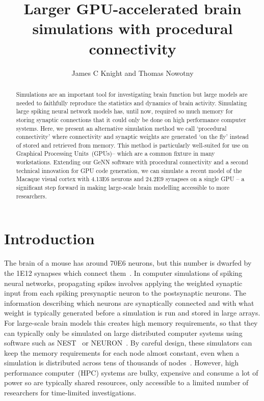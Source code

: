 \documentclass[9pt,a4paper]{amsart}
\title{Larger GPU-accelerated brain simulations with procedural connectivity}
\author{James C Knight and Thomas Nowotny}
\newcommand{\todo}[1]{\textbf{\textsc{\textcolor{red}{(TODO: #1)}}}}
\begin{document}
\begin{abstract}
Simulations are an important tool for investigating brain function but large models are needed to faithfully reproduce the statistics and dynamics of brain activity.
Simulating large spiking neural network models has, until now, required so much memory for storing synaptic connections that it could only be done on high performance computer systems.
Here, we present an alternative simulation method we call `procedural connectivity' where connectivity and synaptic weights are generated `on the fly' instead of stored and retrieved from memory.
This method is particularly well-suited for use on Graphical Processing Units~(GPUs)-- which are a common fixture in many workstations.
Extending our GeNN software with procedural connectivity and a second technical innovation for GPU code generation, we can simulate a recent model of the Macaque visual cortex with \num{4.13E6} neurons and \num{24.2E9} synapses on a single GPU -- a significant step forward in making large-scale brain modelling accessible to more researchers.
\end{abstract}
\maketitle
\section{Introduction}
The brain of a mouse has around \num{70E6} neurons, but this number is dwarfed by the \num{1E12} synapses which connect them~\citep{Herculano-Houzel2010}.
In computer simulations of spiking neural networks, propagating spikes involves  applying the weighted synaptic input from each spiking presynaptic neuron to the postsynaptic neurons.
The information describing which neurons are synaptically connected and with what weight is typically generated before a simulation is run and stored in large arrays. 
For large-scale brain models this creates high memory requirements, so that they can typically only be simulated on large distributed computer systems using software such as NEST~\citep{Gewaltig2007} or NEURON~\citep{carnevale2006neuron}.
By careful design, these simulators can keep the memory requirements for each node almost constant, even when a simulation is distributed across tens of thousands of nodes~\citep{Jordan2018}.
However, high performance computer~(HPC) systems are bulky, expensive and consume a lot of power so are typically shared resources, only accessible to a limited number of researchers for time-limited investigations.
\end{document}
